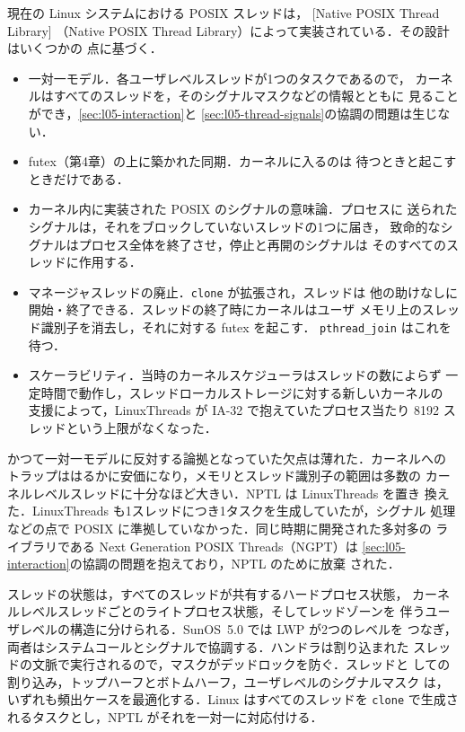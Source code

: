 \documentclass[../main.tex]{subfiles}
\begin{document}
現在の Linux システムにおける POSIX スレッドは，
[Native POSIX Thread Library]%
（Native POSIX Thread
Library）によって実装されている．その設計 \cite{drepper2005} はいくつかの
点に基づく．
\begin{itemize}
  \item 一対一モデル．各ユーザレベルスレッドが1つのタスクであるので，
    カーネルはすべてのスレッドを，そのシグナルマスクなどの情報とともに
    見ることができ，\cref{sec:l05-interaction}と
    \cref{sec:l05-thread-signals}の協調の問題は生じない．
  \item futex（第4章）の上に築かれた同期．カーネルに入るのは
    待つときと起こすときだけである．
  \item カーネル内に実装された POSIX のシグナルの意味論．プロセスに
    送られたシグナルは，それをブロックしていないスレッドの1つに届き，
    致命的なシグナルはプロセス全体を終了させ，停止と再開のシグナルは
    そのすべてのスレッドに作用する．
  \item マネージャスレッドの廃止．\texttt{clone} が拡張され，スレッドは
    他の助けなしに開始・終了できる．スレッドの終了時にカーネルはユーザ
    メモリ上のスレッド識別子を消去し，それに対する futex を起こす．
    \texttt{pthread\_join} はこれを待つ．
  \item スケーラビリティ．当時のカーネルスケジューラはスレッドの数によらず
    一定時間で動作し，スレッドローカルストレージに対する新しいカーネルの
    支援によって，LinuxThreads が IA-32 で抱えていたプロセス当たり 8192
    スレッドという上限がなくなった．
\end{itemize}
かつて一対一モデルに反対する論拠となっていた欠点は薄れた．カーネルへの
トラップははるかに安価になり，メモリとスレッド識別子の範囲は多数の
カーネルレベルスレッドに十分なほど大きい．NPTL は LinuxThreads を置き
換えた．LinuxThreads も1スレッドにつき1タスクを生成していたが，シグナル
処理などの点で POSIX に準拠していなかった．同じ時期に開発された多対多の
ライブラリである Next Generation POSIX Threads（NGPT）は
\cref{sec:l05-interaction}の協調の問題を抱えており，NPTL のために放棄
された．

\begin{keypoint}[章のまとめ]
  スレッドの状態は，すべてのスレッドが共有するハードプロセス状態，
  カーネルレベルスレッドごとのライトプロセス状態，そしてレッドゾーンを
  伴うユーザレベルの構造に分けられる．SunOS~5.0 では LWP が2つのレベルを
  つなぎ，両者はシステムコールとシグナルで協調する．ハンドラは割り込まれた
  スレッドの文脈で実行されるので，マスクがデッドロックを防ぐ．スレッドと
  しての割り込み，トップハーフとボトムハーフ，ユーザレベルのシグナルマスク
  は，いずれも頻出ケースを最適化する．Linux はすべてのスレッドを
  \texttt{clone} で生成されるタスクとし，NPTL がそれを一対一に対応付ける．
\end{keypoint}
\end{document}
